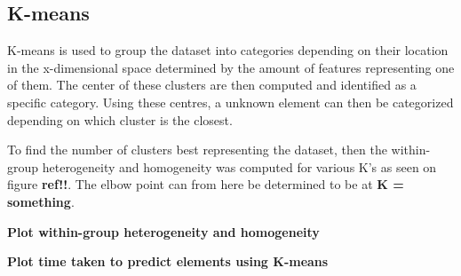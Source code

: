 \subsection{K-means}
K-means is used to group the dataset into categories depending on their location in the x-dimensional space determined by the amount of features representing one of them.
The center of these clusters are then computed and identified as a specific category.
Using these centres, a unknown element can then be categorized depending on which cluster is the closest.

To find the number of clusters best representing the dataset, then the within-group heterogeneity and homogeneity was computed for various K's as seen on figure \textbf{ref!!}.
The elbow point can from here be determined to be at \textbf{K = something}.


\textbf{Plot within-group heterogeneity and homogeneity}


\textbf{Plot time taken to predict elements using K-means}

